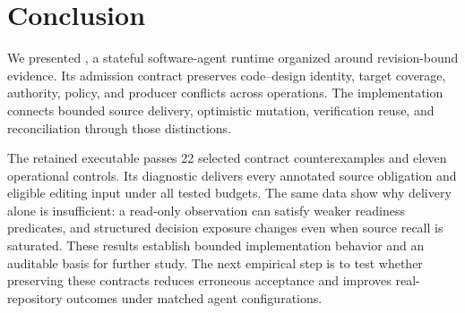 \section{Conclusion}
\label{sec:conclusion}
We presented \wcode{}, a stateful software-agent runtime organized around revision-bound evidence. Its admission contract preserves code--design identity, target coverage, authority, policy, and producer conflicts across operations. The implementation connects bounded source delivery, optimistic mutation, verification reuse, and reconciliation through those distinctions.

The retained executable passes 22 selected contract counterexamples and eleven operational controls. Its diagnostic delivers every annotated source obligation and eligible editing input under all tested budgets. The same data show why delivery alone is insufficient: a read-only observation can satisfy weaker readiness predicates, and structured decision exposure changes even when source recall is saturated. These results establish bounded implementation behavior and an auditable basis for further study. The next empirical step is to test whether preserving these contracts reduces erroneous acceptance and improves real-repository outcomes under matched agent configurations.
